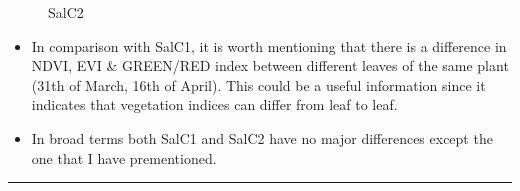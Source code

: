 \documentclass{article}
\begin{document}
{\begin{landscape}
                    \begin{figure}[h]
                        \centering
                        \qquad
                        \caption{SalC2}%
                        \label{fig:example}
                    \end{figure}
                    \vspace*{2\baselineskip}
                    
                    \begin{itemize}
                       \item In comparison with SalC1, it is worth mentioning that there is a difference in NDVI, EVI & GREEN/RED index between different leaves of the same plant (31th of March, 16th of April). This could be a useful information since it indicates that vegetation indices can differ from leaf to leaf.
                       \item In broad terms both SalC1 and SalC2 have no major differences except the one that I have prementioned.
                    \end{itemize}
                    \newpage
                    \vspace*{-3.8\baselineskip}
                    \hrule
                    \vspace*{3\baselineskip}
                    

\end{landscape}}
\end{document}
